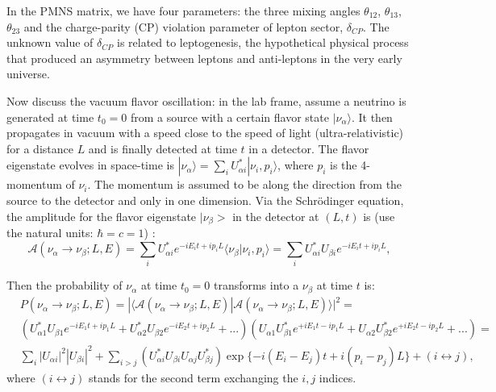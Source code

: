 In the PMNS matrix, we have four parameters: the three mixing angles $\theta_{12}$, $\theta_{13}$, $\theta_{23}$ and the charge-parity (CP) violation parameter of lepton sector, $\delta_{CP}$. The unknown value of $\delta_{CP}$ is related to leptogenesis, the hypothetical physical process that produced an asymmetry between leptons and anti-leptons in the very early universe\cite{wiki_cp}. 

Now discuss the vacuum flavor oscillation: in the lab frame, assume a neutrino is generated at time $t_0=0$ from a source with a certain flavor state $|\nu_\alpha\rangle$. It then propagates in vacuum with a speed close to the speed of light (ultra-relativistic) for a distance $L$ and is finally detected at time $t$ in a detector. The flavor eigenstate evolves in space-time is $|\nu_\alpha \rangle = \sum_i U^*_{\alpha i}|\nu_i,p_i\rangle$, where $p_i$ is the 4-momentum of $\nu_i$. The momentum is assumed to be along the direction from the source to the detector and only in one dimension. Via the Schr\"{o}dinger equation, the amplitude for the flavor eigenstate $|\nu_\beta>$ in the detector at $(L,t)$ is (use the natural units: $\hbar=c=1$) \cite{aitchison2012gauge}:
\begin{equation}
\mathcal{A}(\nu_\alpha\to\nu_\beta;L,E)=\sum_{i}U^*_{\alpha i}e^{-iE_i t+ip_iL}\langle\nu_\beta|\nu_i,p_i\rangle=\sum_{i}U^*_{\alpha i}U_{\beta i}e^{-iE_it+ip_iL},
\end{equation}

Then the probability of $\nu_\alpha$ at time $t_0=0$ transforms into a $\nu_\beta$ at time $t$ is:
\begin{equation}\label{oscillationEq1}
 \begin{split}
&P(\nu_\alpha\to\nu_\beta;L,E)=|\langle\mathcal{A}(\nu_\alpha\to\nu_\beta;L,E)|\mathcal{A}(\nu_\alpha\to\nu_\beta;L,E)\rangle|^2=\\
&(U^*_{\alpha 1}U_{\beta 1}e^{-iE_1t+ip_1L}+U^*_{\alpha 2}U_{\beta 2}e^{-iE_2t+ip_2L}+...)(U_{\alpha 1}U^*_{\beta 1}e^{+iE_1t-ip_1L}+U_{\alpha 2}U^*_{\beta 2}e^{+iE_2t-ip_2L}+...)=\\
&\sum_i |U_{\alpha i}|^2|U_{\beta i}|^2 + \sum_{i>j}(U^*_{\alpha i}U_{\beta i}U_{\alpha j}U^*_{\beta j})\exp\{-i(E_i-E_j)t+i(p_i-p_j)L\}+(i\leftrightarrow j),
\end{split}
\end{equation}
where $(i\leftrightarrow j)$ stands for the second term exchanging the $i,j$ indices.

